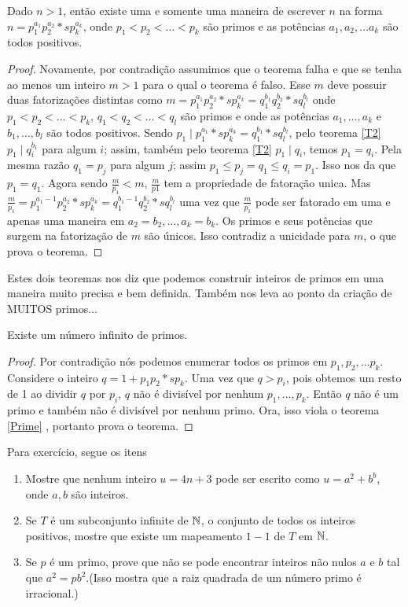 \begin{theorem}
    Dado $n > 1$, então existe uma e somente uma maneira de escrever $n$ na forma $n= p^{a_{1}}_{1}p^{a_{2}}_{2}*s p^{a_{k}}_{k}$, onde $p_{1} < p_{2} < \ldots < p_{k}$ são primos e as potências $a_{1}, a_{2},\ldots a_{k}$ são todos positivos.
    \begin{proof}
        Novamente, por contradição assumimos que o teorema falha e que se tenha ao menos um inteiro $m>1$ para o qual o teorema é falso. Esse $m$ deve possuir duas fatorizações distintas como $m=p^{a_{1}}_{1}p^{a_{2}}_{2}*s p^{a_{k}}_{k} = q^{b_{1}}_{1}q^{b_{2}}_{2}*s q^{b_{l}}_{l}$ onde $p_{1} < p_{2} < \ldots < p_{k}$, $q_{1} < q_{2} < \ldots < q_{l}$ são primos e onde as potências $a_{1}, \ldots , a_{k}$ e $b_{1},\ldots , b_{l}$ são todos positivos. Sendo $p_{1}\mid p^{a_{1}}_{1}*s p^{a_{k}}_{k} = q^{b_{1}}_{1}*s q^{b_{l}}_{l}$, pelo teorema \ref{T2} $p_{1}\mid q^{b_{1}}_{i}$ para algum $i$; assim, também pelo teorema \ref{T2} $p_{1}\mid q_{i}$, temos $p_{1} = q_{i}$. Pela mesma razão $q_{1} = p_{j}$ para algum $j$; assim $p_{1}\leq p_{j} = q_{1} \leq q_{i} = p_{1}$. Isso nos da que $p_{1} = q_{1}$. Agora sendo $\tfrac{m}{p_{1}} < m$, $\tfrac{m}{p{1}}$ tem a propriedade de fatoração unica. Mas $\tfrac{m}{p_{1}} = p^{a_{1}-1}_{1}p^{a_{2}}_{2}*s p^{a_{k}}_{k} = q^{b_{1}-1}_{1}q^{b_{2}}_{2}*s q^{b_{l}}_{l}$ uma vez que $\tfrac{m}{p_{1}}$ pode ser fatorado em uma e apenas uma maneira em $a_{2}=b_{2},\ldots , a_{k} = b_{k}$. Os primos e seus potências que surgem na fatorização de $m$ são únicos. Isso contradiz a unicidade para $m$, o que prova o teorema.
    \end{proof}
\end{theorem}
Estes dois teoremas nos diz que podemos construir inteiros de primos em uma maneira muito precisa e bem definida. Também nos leva ao ponto da criação de MUITOS primos...
\begin{theorem}
    Existe um número infinito de primos.
    \begin{proof}
        Por contradição nós podemos enumerar todos os primos em $p_{1},p_{2},\ldots p_{k}$. Considere o inteiro $q=1+p_{1}p_{2}*s p_{k}.$ Uma vez que $q>p_{i}$, pois obtemos um resto de 1 ao dividir $q$ por $p_{i}$, $q$ não é divisível por nenhum $p_{1},\ldots , p_{k}$. Então $q$ não é um primo e também não é divisível por nenhum primo. Ora, isso viola o teorema \ref{Prime} , portanto prova o teorema.
    \end{proof}
\end{theorem}
Para exercício, segue os itens
\begin{enumerate}
    \item Mostre que nenhum inteiro $u=4n + 3$ pode ser escrito como $u=a^{2} + b^{b}$, onde $a,b$ são inteiros.
    \item Se $T$ é um subconjunto infinite de $\mathbb{N}$, o conjunto de todos os inteiros positivos, mostre que existe um mapeamento $1-1$ de $T$ em $\mathbb{N}$.
    \item Se $p$ é um primo, prove que não se pode encontrar inteiros não nulos $a$ e $b$ tal que $a^{2} = pb^{2}$.(Isso mostra que a raiz quadrada de um número primo é irracional.)
\end{enumerate}
